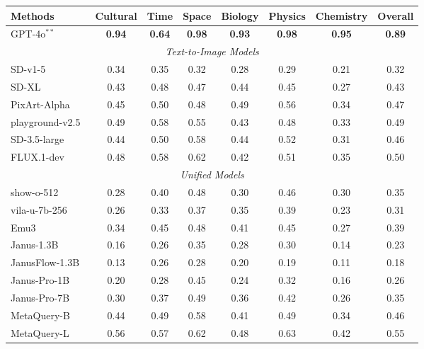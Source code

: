 \documentclass[]{fairmeta}
\newcommand\our{{\fontfamily{lmtt}\selectfont MetaQuery}\xspace}
\begin{document}
\begin{table}[!t]
    \centering
    \small
    \setlength{\tabcolsep}{8pt}
    \begin{tabular}{lccccccc}
    \textbf{Methods} & \textbf{Cultural}  & \textbf{Time}     & \textbf{Space}    & \textbf{Biology}    & \textbf{Physics} & \textbf{Chemistry} & \textbf{Overall} \\
    \midrule
    \rowcolor{green!25} GPT-4o$^{**}$~\citep{gpt4oimagegeneration} & \textbf{0.94} & \textbf{0.64} & \textbf{0.98} & \textbf{0.93} & \textbf{0.98} & \textbf{0.95} & \textbf{0.89} \\
    \midrule
    \multicolumn{8}{c}{\textit{Text-to-Image Models}} \\
 SD-v1-5~\citep{sd1p5} & 0.34 & 0.35& 0.32&0.28 &0.29 &0.21 & 0.32\\
 SD-XL~\citep{sdxl} &0.43  & 0.48 &0.47  &0.44  &0.45 &0.27 & 0.43 \\
 PixArt-Alpha~\citep{pixart} & 0.45  & 0.50& 0.48 & 0.49& 0.56 &0.34 & 0.47\\
 playground-v2.5~\citep{playgroundv2p5} & 0.49  &\cellcolor{green!10}0.58  & 0.55&0.43  & 0.48&0.33 & 0.49 \\
 SD-3.5-large~\citep{sd3} & 0.44 &0.50 &0.58  & 0.44&0.52 &0.31 & 0.46 \\
 FLUX.1-dev~\citep{flux} & 0.48  & \cellcolor{green!10}0.58 &\cellcolor{green!10}0.62  &0.42  &0.51 & 0.35 & 0.50 \\
    \midrule 
    \multicolumn{8}{c}{\textit{Unified Models}} \\
 show-o-512 \citep{showo} & 0.28 &0.40  &0.48 & 0.30& 0.46 & 0.30 & 0.35\\
 vila-u-7b-256 \citep{vilau} & 0.26 &0.33  & 0.37 &0.35  &0.39 &0.23 & 0.31\\
 Emu3~\citep{emu3} & 0.34 & 0.45 & 0.48 & 0.41  & 0.45 & 0.27 & 0.39 \\
 Janus-1.3B~\citep{janus} &0.16 &0.26 &0.35 & 0.28 &0.30 & 0.14& 0.23\\
 JanusFlow-1.3B~\citep{janusflow} &0.13 &0.26 &0.28 & 0.20& 0.19&0.11 & 0.18\\
 Janus-Pro-1B \citep{januspro} & 0.20& 0.28&0.45 & 0.24 & 0.32& 0.16& 0.26\\
 Janus-Pro-7B \citep{januspro} & 0.30& 0.37& 0.49 & 0.36&0.42 &0.26 & 0.35 \\
    \midrule
    \our-B & 0.44 & 0.49 & 0.58 & 0.41 & 0.49 & 0.34 & 0.46 \\
    \our-L & \cellcolor{green!10}0.56& 0.57 &\cellcolor{green!10}0.62 & 0.48 &  \cellcolor{green!10}0.63 &  \cellcolor{green!10}0.42 & \cellcolor{green!10}0.55 \\

\end{tabular}
\end{table}
\end{document}
